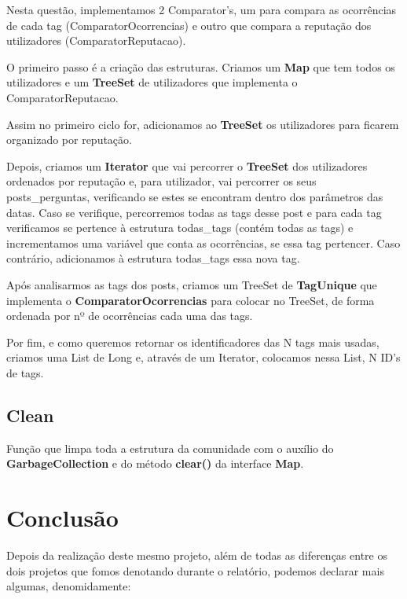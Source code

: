 \documentclass[a4paper]{article}
\begin{document}
Nesta questão, implementamos 2 Comparator's, um para compara as ocorrências de 
cada tag (ComparatorOcorrencias) e outro que compara a reputação dos utilizadores 
(ComparatorReputacao).

O primeiro passo é a criação das estruturas. Criamos um \textbf{Map} que tem todos 
os utilizadores e um \textbf{TreeSet} de utilizadores que implementa o 
ComparatorReputacao.

Assim no primeiro ciclo for, adicionamos ao \textbf{TreeSet} os utilizadores para 
ficarem organizado por reputação.

Depois, criamos um \textbf{Iterator} que vai percorrer o \textbf{TreeSet} dos
utilizadores ordenados por reputação e, para utilizador, vai percorrer os seus
posts\_perguntas, verificando se estes se encontram dentro dos parâmetros das datas.
Caso se verifique, percorremos todas as tags desse post e para cada tag verificamos
se pertence à estrutura todas\_tags (contém todas as tags) e incrementamos uma
variável que conta as ocorrências, se essa tag pertencer. Caso contrário, 
adicionamos à estrutura todas\_tags essa nova tag.

Após analisarmos as tags dos posts, criamos um TreeSet de \textbf{TagUnique} que
implementa o \textbf{ComparatorOcorrencias} para colocar no TreeSet, de forma
ordenada por nº de ocorrências cada uma das tags.

Por fim, e como queremos retornar os identificadores das N tags mais usadas, criamos
uma List de Long e, através de um Iterator, colocamos nessa List, N ID's de tags.

\subsection{Clean}

Função que limpa toda a estrutura da comunidade com o auxílio do 
\textbf{GarbageCollection} e do método \textbf{clear()} da interface \textbf{Map}.

\section{Conclusão}
\label{sec:conclusao} 

Depois da realização deste mesmo projeto, além de todas as diferenças entre os dois 
projetos que fomos denotando durante o relatório, podemos declarar mais algumas, 
denomidamente:
\end{document}
